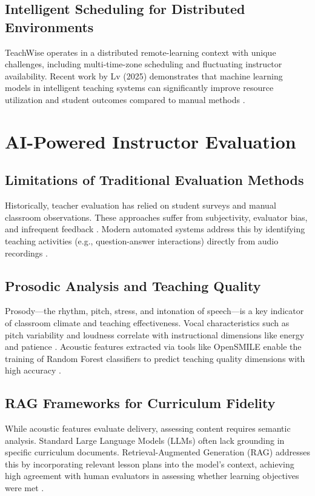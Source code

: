 \subsection{Intelligent Scheduling for Distributed Environments}
TeachWise operates in a distributed remote-learning context with unique challenges, including multi-time-zone scheduling and fluctuating instructor availability. Recent work by Lv (2025) demonstrates that machine learning models in intelligent teaching systems can significantly improve resource utilization and student outcomes compared to manual methods \cite{Lv2025}.

\section{AI-Powered Instructor Evaluation}
\subsection{Limitations of Traditional Evaluation Methods}
Historically, teacher evaluation has relied on student surveys and manual classroom observations. These approaches suffer from subjectivity, evaluator bias, and infrequent feedback \cite{Almubarak2025}. Modern automated systems address this by identifying teaching activities (e.g., question-answer interactions) directly from audio recordings \cite{Donnelly2016, Stone2019}.

\subsection{Prosodic Analysis and Teaching Quality}
Prosody—the rhythm, pitch, stress, and intonation of speech—is a key indicator of classroom climate and teaching effectiveness. Vocal characteristics such as pitch variability and loudness correlate with instructional dimensions like energy and patience \cite{Shoukat2025, Pardo2025}. Acoustic features extracted via tools like OpenSMILE enable the training of Random Forest classifiers to predict teaching quality dimensions with high accuracy \cite{Eyben2010, Jensen2020}.

\subsection{RAG Frameworks for Curriculum Fidelity}
While acoustic features evaluate delivery, assessing content requires semantic analysis. Standard Large Language Models (LLMs) often lack grounding in specific curriculum documents. Retrieval-Augmented Generation (RAG) addresses this by incorporating relevant lesson plans into the model's context, achieving high agreement with human evaluators in assessing whether learning objectives were met \cite{Gao2024}.

